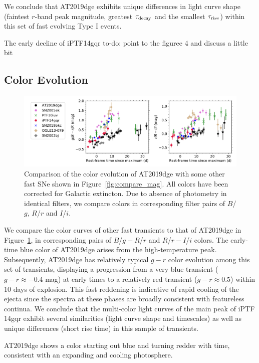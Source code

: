 \documentclass[twocolumn]{aastex63}
\newcommand{\todo}[1]{{\color{magenta} to-do: {#1}}}
\begin{document}
\begin{CJK*}{UTF8}{gbsn}
We conclude that AT2019dge exhibits unique differences in light curve shape (faintest $r$-band peak 
magnitude, greatest $\tau_{\rm decay}$ and the smallest $\tau_{\rm rise}$) within this set of fast 
evolving Type I events. 

The early decline of iPTF14gqr \todo{point to the figuree 4 and discuss a little bit}


\subsection{Color Evolution}
\begin{figure}[htbp!]
	\centering
	    \includegraphics[width=\textwidth]{figures/compare_color.pdf}
	\caption{Comparison of the color evolution of AT2019dge with some other fast SNe shown in 
	Figure~\ref{fig:compare_mag}. All colors have been corrected for Galactic extincton. Due to absence 
	of photometry in identical filters, we compare colors in corresponding filter pairs of $B$/$g$, 
	$R$/$r$ and 
	$I$/$i$. \label{fig:compare_color}}
\end{figure}

We compare the color curves of other fast transients to that of AT2019dge in 
Figure~\ref{fig:compare_color}, in corresponding pairs of $B$/$g-R$/$r$ and $R$/$r-I$/$i$ colors. The 
early-time blue color of AT2019dge arises from the high-temperature peak. Subsequently, AT2019dge 
has relatively typical $g-r$ color evolution among this set of transients, displaying a 
progression from a very blue transient ($g-r \approx -0.4$ mag) at early times to a relatively red 
transient ($g-r \approx 0.5$) within 10 days of explosion. This fast reddening is indicative of rapid 
cooling of the ejecta since the spectra at these phases are broadly consistent with featureless 
continua. We conclude that the multi-color light curves of the main peak of iPTF 14gqr exhibit several 
similarities (light curve shape and timescales) as well as unique differences (short rise time) in this 
sample of transients.

AT2019dge shows a color starting out blue and turning redder with time, consistent with an expanding 
and cooling photosphere.


\end{CJK*}
\end{document}
